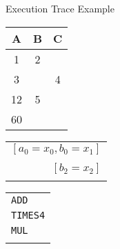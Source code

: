 \begin{frame}[allowframebreaks]{Execution Trace Example}
\begin{large}
\begin{table}[h!]
\begin{tabular}{|c|c|c|}
\hline
\textbf{A} & \textbf{B} & \cellcolor{lightgray} \textbf{C} \\ \hline
1 & 2 & \cellcolor{lightgray} \\ \hline
3 & & \cellcolor{lightgray} 4 \\ \hline
12 & 5 & \cellcolor{lightgray} \\ \hline
60 & & \cellcolor{lightgray} \\ \hline
\end{tabular}
\hspace{1mm}
\begin{tabular}{r}
                    \\
$[a_0=x_0, b_0=x_1]$  \\
                    \\
$[b_2 = x_2]$         \\
                    \\

\end{tabular}
\hspace{1em}
\begin{tabular}{l}
                    \\
\texttt{ADD} \\
\texttt{TIMES4} \\
\texttt{MUL} \\
\\
\end{tabular}
\end{table}
\end{large}
\end{frame}





